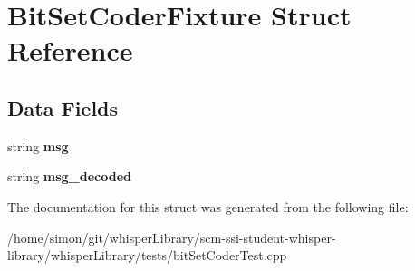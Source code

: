 \hypertarget{structBitSetCoderFixture}{\section{\-Bit\-Set\-Coder\-Fixture \-Struct \-Reference}
\label{structBitSetCoderFixture}
}
\subsection*{\-Data \-Fields}
\begin{DoxyCompactItemize}
\item 
\hypertarget{structBitSetCoderFixture_a53b0ad675608f7f7c5d6c8b349c4d7b1}{string {\bfseries msg}}\label{structBitSetCoderFixture_a53b0ad675608f7f7c5d6c8b349c4d7b1}

\item 
\hypertarget{structBitSetCoderFixture_a8fac4b554d376d12c514f648a8d914c8}{string {\bfseries msg\-\_\-decoded}}\label{structBitSetCoderFixture_a8fac4b554d376d12c514f648a8d914c8}

\end{DoxyCompactItemize}


\-The documentation for this struct was generated from the following file\-:\begin{DoxyCompactItemize}
\item 
/home/simon/git/whisper\-Library/scm-\/ssi-\/student-\/whisper-\/library/whisper\-Library/tests/bit\-Set\-Coder\-Test.\-cpp\end{DoxyCompactItemize}
